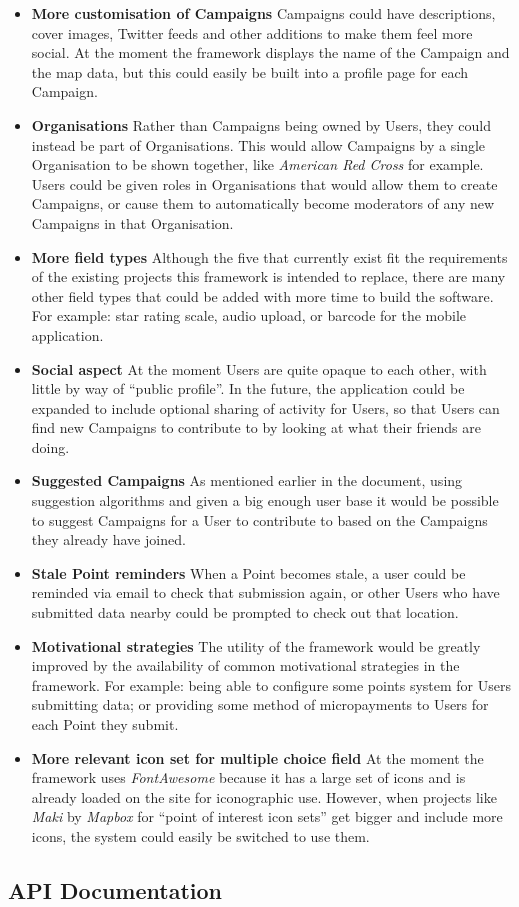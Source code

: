 \documentclass{article}
\newcommand{\pitem}[1]{
	\item{\textbf{#1}}
}
\begin{document}
		\begin{itemize}
			\pitem{More customisation of Campaigns} Campaigns could have descriptions, cover images, Twitter feeds and other additions to make them feel more social. At the moment the framework displays the name of the Campaign and the map data, but this could easily be built into a profile page for each Campaign.
			\pitem{Organisations} Rather than Campaigns being owned by Users, they could instead be part of Organisations. This would allow Campaigns by a single Organisation to be shown together, like \emph{American Red Cross} for example. Users could be given roles in Organisations that would allow them to create Campaigns, or cause them to automatically become moderators of any new Campaigns in that Organisation.
			\pitem{More field types} Although the five that currently exist fit the requirements of the existing projects this framework is intended to replace, there are many other field types that could be added with more time to build the software. For example: star rating scale, audio upload, or barcode for the mobile application.
			\pitem{Social aspect} At the moment Users are quite opaque to each other, with little by way of ``public profile''. In the future, the application could be expanded to include optional sharing of activity for Users, so that Users can find new Campaigns to contribute to by looking at what their friends are doing.
			\pitem{Suggested Campaigns} As mentioned earlier in the document, using suggestion algorithms and given a big enough user base it would be possible to suggest Campaigns for a User to contribute to based on the Campaigns they already have joined.
			\pitem{Stale Point reminders} When a Point becomes stale, a user could be reminded via email to check that submission again, or other Users who have submitted data nearby could be prompted to check out that location.
			\pitem{Motivational strategies} The utility of the framework would be greatly improved by the availability of common motivational strategies in the framework. For example: being able to configure some points system for Users submitting data; or providing some method of micropayments to Users for each Point they submit.
			\pitem{More relevant icon set for multiple choice field} At the moment the framework uses \emph{FontAwesome} because it has a large set of icons and is already loaded on the site for iconographic use. However, when projects like \emph{Maki} by \emph{Mapbox} for ``point of interest icon sets'' get bigger and include more icons, the system could easily be switched to use them.
		\end{itemize}

	\clearpage
	
	

	\clearpage
	\begin{appendices}
	\section{API Documentation}
	\label{sec:api-docs}
	\end{appendices}
\end{document}
